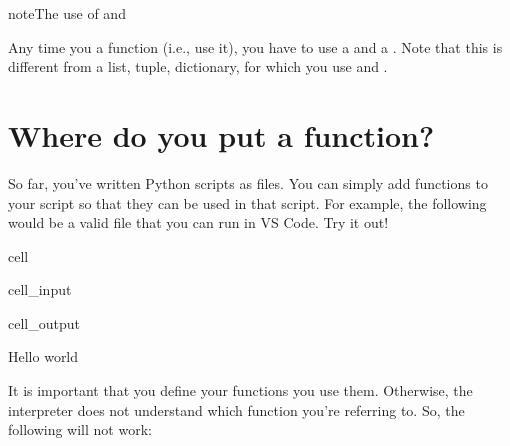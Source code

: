 \documentclass[letterpaper,10pt,english]{jupyterBook}
\begin{document}
\begin{sphinxadmonition}{note}{The use of \sphinxstyleliteralintitle{\sphinxupquote{(}} and \sphinxstyleliteralintitle{\sphinxupquote{)}}}

\sphinxAtStartPar
Any time you  a function (i.e., use it), you have to use a \sphinxcode{\sphinxupquote{(}} and a \sphinxcode{\sphinxupquote{)}}. Note that this is different from  a list, tuple, dictionary, for which you use \sphinxcode{\sphinxupquote{{[}}} and \sphinxcode{\sphinxupquote{{]}}}.
\end{sphinxadmonition}


\section{Where do you put a function?}
\label{\detokenize{notebooks/04_Functions/04_Functions_student:where-do-you-put-a-function}}
\sphinxAtStartPar
So far, you’ve written Python scripts as  files. You can simply add functions to your script so that they can be used in that script. For example, the following would be a valid  file that you can run in VS Code. Try it out!

\begin{sphinxuseclass}{cell}\begin{sphinxVerbatimInput}

\begin{sphinxuseclass}{cell_input}
\begin{sphinxVerbatim}[commandchars=\\\{\}]
         
      
    
             
\end{sphinxVerbatim}

\end{sphinxuseclass}\end{sphinxVerbatimInput}
\begin{sphinxVerbatimOutput}

\begin{sphinxuseclass}{cell_output}
\begin{sphinxVerbatim}[commandchars=\\\{\}]
Hello world
\end{sphinxVerbatim}

\end{sphinxuseclass}\end{sphinxVerbatimOutput}

\end{sphinxuseclass}
\sphinxAtStartPar
It is important that you define your functions  you use them. Otherwise, the interpreter does not understand which function you’re referring to. So, the following will not work:
\end{document}
